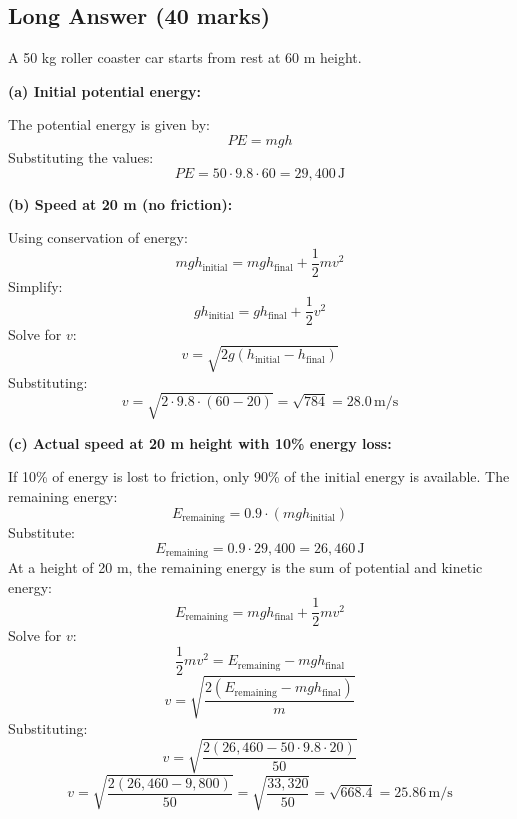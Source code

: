 \documentclass[addpoints]{exam}
\begin{document}
\begin{questions}
\section*{Long Answer (40 marks)}

\question A 50 kg roller coaster car starts from rest at 60 m height.
\begin{solution}[8cm]
\textbf{(a) Initial potential energy:}  

    The potential energy is given by:  
    \[
    PE = m g h
    \]  
    Substituting the values:  
    \[
    PE = 50 \cdot 9.8 \cdot 60 = 29,400 \, \text{J}
    \]  

    \textbf{(b) Speed at 20 m (no friction):}  

    Using conservation of energy:  
    \[
    m g h_\text{initial} = m g h_\text{final} + \frac{1}{2} m v^2
    \]  
    Simplify:  
    \[
    g h_\text{initial} = g h_\text{final} + \frac{1}{2} v^2
    \]  
    Solve for \( v \):  
    \[
    v = \sqrt{2 g (h_\text{initial} - h_\text{final})}
    \]  
    Substituting:  
    \[
    v = \sqrt{2 \cdot 9.8 \cdot (60 - 20)} = \sqrt{784} = 28.0 \, \text{m/s}
    \]  

    \textbf{(c) Actual speed at 20 m height with 10\% energy loss:}  

    If 10\% of energy is lost to friction, only 90\% of the initial energy is available.  
    The remaining energy:  
    \[
    E_\text{remaining} = 0.9 \cdot (m g h_\text{initial})
    \]  
    Substitute:  
    \[
    E_\text{remaining} = 0.9 \cdot 29,400 = 26,460 \, \text{J}
    \]  
    At a height of 20 m, the remaining energy is the sum of potential and kinetic energy:  
    \[
    E_\text{remaining} = m g h_\text{final} + \frac{1}{2} m v^2
    \]  
    Solve for \( v \):  
    \[
    \frac{1}{2} m v^2 = E_\text{remaining} - m g h_\text{final}
    \]  
    \[
    v = \sqrt{\frac{2 (E_\text{remaining} - m g h_\text{final})}{m}}
    \]  
    Substituting:  
    \[
    v = \sqrt{\frac{2 (26,460 - 50 \cdot 9.8 \cdot 20)}{50}}
    \]  
    \[
    v = \sqrt{\frac{2 (26,460 - 9,800)}{50}} = \sqrt{\frac{33,320}{50}} = \sqrt{668.4} = 25.86 \, \text{m/s}
    \]  


\end{solution}
\end{questions}
\end{document}
